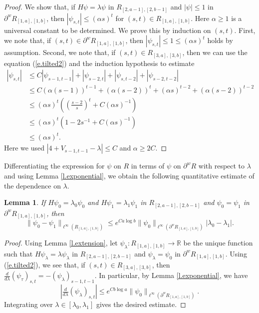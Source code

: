 \documentclass{amsart}
\newtheorem{lemma}[equation]{Lemma}
\newcommand{\eref}[1]{(\ref{e.#1})}
\newcommand{\lref}[1]{Lemma \ref{l.#1}}
\numberwithin{equation}{section}
\numberwithin{figure}{section}
\newcommand{\R}{\mathbb{R}}
\begin{document}
\begin{proof}
We show that, if $H \psi = \lambda \psi$ in $R_{[2,a-1],[2,b-1]}$ and $|\psi| \leq 1$ in $\partial^w R_{[1,a],[1,b]}$, then $|\psi_{s,t}| \leq (\alpha s)^t$ for $(s,t) \in R_{[1,a],[1,b]}$.  Here $\alpha \geq 1$ is a universal constant to be determined.  We prove this by induction on $(s,t)$.  First, we note that, if $(s,t) \in \partial^w R_{[1,a],[1,b]}$, then $|\psi_{s,t}| \leq 1 \leq (\alpha s)^t$ holds by assumption.  Second, we note that, if $(s, t) \in R_{[3,a],[3,b]}$, then we can use the equation \eref{tilted2} and the induction hypothesis to estimate
\begin{equation*}
\begin{aligned}
|\psi_{s,t}|
& \leq C |\psi_{s-1,t-1}| + |\psi_{s-2,t}| + |\psi_{s,t-2}| + |\psi_{s-2,t-2}| \\
& \leq C (\alpha (s-1))^{t-1} + (\alpha (s-2))^t + (\alpha s)^{t-2} + (\alpha(s-2))^{t-2} \\
& \leq (\alpha s)^t ((\tfrac{s-2}{s})^t + C (\alpha s)^{-1}) \\
& \leq (\alpha s)^t (1 - 2 s^{-1} + C (\alpha s)^{-1}) \\
& \leq (\alpha s)^{t}.
\end{aligned}
\end{equation*}
Here we used $|4 + V_{s-1,t-1} - \lambda| \leq C$ and $\alpha \geq 2 C$.
\end{proof}

Differentiating the expression for $\psi$ on $R$ in terms of $\psi$ on $\partial^w R$ with respect to $\lambda$ and using \lref{exponential}, we obtain the following quantitative estimate of the dependence on $\lambda$.

\begin{lemma}
\label{l.lambdadependence}
If $H \psi_0 = \lambda_0 \psi_0$ and $H \psi_1 = \lambda_1 \psi_1$  in $R_{[2,a-1],[2,b-1]}$ and $\psi_0 = \psi_1$ in $\partial^w R_{[1,a],[1,b]}$, then
\begin{equation*}
\| \psi_0 - \psi_1 \|_{\ell^\infty(R_{[1,a],[1,b]})} \leq e^{C a \log b} \| \psi_0 \|_{\ell^\infty(\partial^w R_{[1,a],[1,b]})} |\lambda_0 - \lambda_1|.
\end{equation*}
\end{lemma}

\begin{proof}
Using \lref{extension}, let $\psi_\lambda : R_{[1,a],[1,b]} \to \R$ be the unique function such that $H \psi_\lambda = \lambda \psi_\lambda$ in $R_{[2,a-1],[2,b-1]}$ and $\psi_\lambda = \psi_0$ in $\partial^w R_{[1,a],[1,b]}$.  Using \eref{tilted2}, we see that, if $(s,t) \in R_{[3,a],[3,b]}$, then $\tfrac{d}{d \lambda} (\psi_\tau)_{s,t} = - (\psi_\lambda)_{s-1,t-1}$.  In particular, by \lref{exponential}, we have
\begin{equation*}
|\tfrac{d}{d \lambda} (\psi_\lambda)_{s,t}| \leq e^{C b\log a} \|\psi_0\|_{\ell^\infty(\partial^w R_{[1,a],[1,b]})}.
\end{equation*}
Integrating over $\lambda \in [\lambda_0,\lambda_1]$ gives the desired estimate.
\end{proof}
\end{document}
